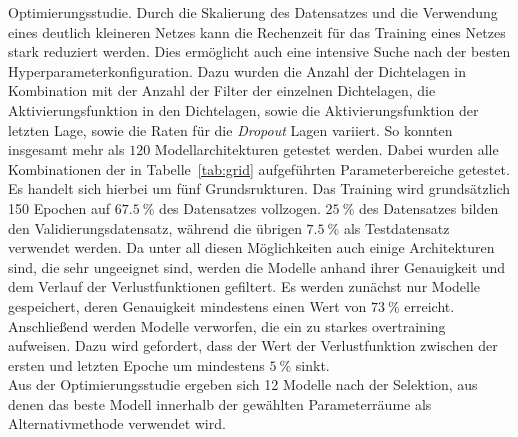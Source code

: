 Optimierungsstudie. Durch die Skalierung des Datensatzes und die Verwendung
eines deutlich kleineren Netzes kann die Rechenzeit für das Training eines
Netzes stark reduziert werden. Dies ermöglicht auch eine intensive Suche nach
der besten Hyperparameterkonfiguration. Dazu wurden die Anzahl der Dichtelagen
in Kombination mit der Anzahl der Filter der einzelnen Dichtelagen, die
Aktivierungsfunktion in den Dichtelagen, sowie die Aktivierungsfunktion der
letzten Lage, sowie die Raten für die \textit{Dropout} Lagen variiert. So
konnten insgesamt mehr als $120$ Modellarchitekturen getestet werden. Dabei
wurden alle Kombinationen der in Tabelle~\ref{tab:grid} aufgeführten
Parameterbereiche getestet. Es handelt sich hierbei um fünf Grundsrukturen.
Das Training wird grundsätzlich 150 Epochen auf $\SI{67.5}{\percent}$ des
Datensatzes vollzogen. $\SI{25}{\percent}$ des Datensatzes bilden den
Validierungsdatensatz, während die übrigen $\SI{7.5}{\percent}$ als
Testdatensatz verwendet werden.
Da unter all diesen Möglichkeiten auch einige Architekturen sind, die sehr
ungeeignet sind, werden die Modelle anhand ihrer Genauigkeit und dem Verlauf
der Verlustfunktionen gefiltert. Es werden zunächst nur Modelle gespeichert,
deren Genauigkeit mindestens einen Wert von $\SI{73}{\percent}$ erreicht.
Anschließend werden Modelle verworfen, die ein zu starkes overtraining
aufweisen. Dazu wird gefordert, dass der Wert der Verlustfunktion zwischen der
ersten und letzten Epoche um mindestens $\SI{5}{\percent}$ sinkt.\\
Aus der Optimierungsstudie ergeben sich 12 Modelle nach der Selektion, aus
denen das beste Modell innerhalb der gewählten Parameterräume als
Alternativmethode verwendet wird.\\

